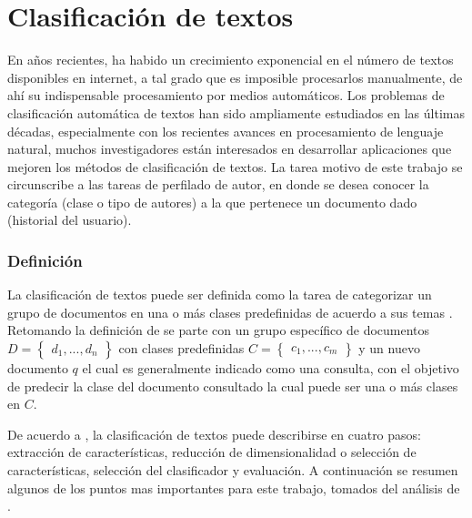 \section{Clasificación de textos}

En años recientes, ha habido un crecimiento exponencial en el número de textos disponibles en internet, a tal grado que es imposible procesarlos  manualmente, de ahí su indispensable procesamiento por medios automáticos. Los problemas de clasificación automática de textos han sido ampliamente estudiados en las últimas décadas, especialmente con los recientes avances en procesamiento de lenguaje natural, muchos investigadores están interesados en desarrollar aplicaciones que mejoren los métodos de clasificación de textos. La tarea motivo de este trabajo se circunscribe a las tareas de perfilado de autor, en donde se desea conocer la categoría (clase o tipo de autores) a la que pertenece un documento dado (historial del usuario).

\subsubsection{Definición}

La clasificación de textos puede ser definida como la tarea de categorizar un grupo de documentos en una o más clases predefinidas de acuerdo a sus temas \citep{Kadhim2019}. Retomando la definición de \citep{Kadhim2019} se parte con un grupo específico de documentos  $D={\begin{Bmatrix} d_1 , ... , d_n \end{Bmatrix}}$ con clases predefinidas $C={\begin{Bmatrix} c_1 , ... , c_m \end{Bmatrix}}$ y un nuevo documento $q$ el cual es generalmente indicado como una consulta,  con el objetivo de predecir la  clase del documento consultado la cual puede ser una o más clases en $C$.

 
De acuerdo a \citep{kowsari2019text}, la clasificación de textos puede describirse en cuatro pasos: extracción de características, reducción de dimensionalidad o selección de características, selección del clasificador y evaluación. A continuación  se resumen algunos de los puntos mas importantes para este trabajo, tomados del análisis de \citep{kowsari2019text}.

